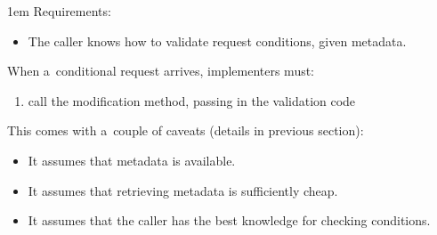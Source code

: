 \documentclass[10pt]{article}
\newenvironment{Note}
  {\begin{multicols}{3}%
     \parskip 1em}
  {\end{multicols}}
\begin{document}
\begin{Note}
Requirements:
\begin{itemize}
  \item The caller knows how to validate request conditions,
        given metadata.
\end{itemize}

\bigskip
When a~conditional request arrives, implementers must:
\begin{enumerate}
  \item call the modification method,
        passing in the validation code
\end{enumerate}

\bigskip
This comes with a~couple of caveats
(details in previous section):
\begin{itemize}
  \item It assumes that metadata is available.
  \item It assumes that retrieving metadata is sufficiently cheap.
  \item It assumes that the caller has the best knowledge for checking conditions.
\end{itemize}

\columnbreak
\null


\columnbreak
\null


\end{Note}
\end{document}
